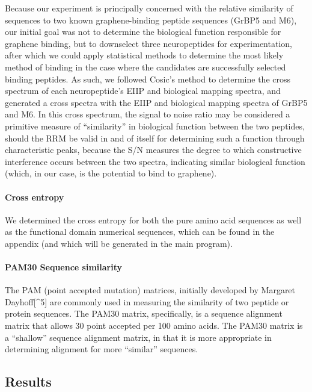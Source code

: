 \documentclass[]{article}
\let\oldparagraph\paragraph
\renewcommand{\paragraph}[1]{\oldparagraph{#1}\mbox{}}
\begin{document}
	Because our experiment is principally concerned with the relative
	similarity of sequences to two known graphene-binding peptide sequences
	(GrBP5 and M6), our initial goal was not to determine the biological
	function responsible for graphene binding, but to downselect three
	neuropeptides for experimentation, after which we could apply
	statistical methods to determine the most likely method of binding in
	the case where the candidates are successfully selected binding
	peptides. As such, we followed Cosic's method to determine the cross
	spectrum of each neuropeptide's EIIP and biological mapping spectra, and
	generated a cross spectra with the EIIP and biological mapping spectra
	of GrBP5 and M6. In this cross spectrum, the signal to noise ratio may
	be considered a primitive measure of ``similarity'' in biological
	function between the two peptides, should the RRM be valid in and of
	itself for determining such a function through characteristic peaks,
	because the S/N measures the degree to which constructive interference
	occurs between the two spectra, indicating similar biological function
	(which, in our case, is the potential to bind to graphene).
	
	\hypertarget{cross-entropy}{%
		\paragraph{Cross entropy}\label{cross-entropy}}
	
	We determined the cross entropy for both the pure amino acid sequences
	as well as the functional domain numerical sequences, which can be found
	in the appendix (and which will be generated in the main program).
	
	\hypertarget{pam30-sequence-similarity}{%
		\paragraph{PAM30 Sequence similarity}\label{pam30-sequence-similarity}}
	
	The PAM (point accepted mutation) matrices, initially developed by
	Margaret Dayhoff{[}\^{}5{]} are commonly used in measuring the
	similarity of two peptide or protein sequences. The PAM30 matrix,
	specifically, is a sequence alignment matrix that allows 30 point
	accepted per 100 amino acids. The PAM30 matrix is a ``shallow'' sequence
	alignment matrix, in that it is more appropriate in determining
	alignment for more ``similar'' sequences.
	
	\hypertarget{results}{%
		\subsection{Results}\label{results}}
	
\end{document}
